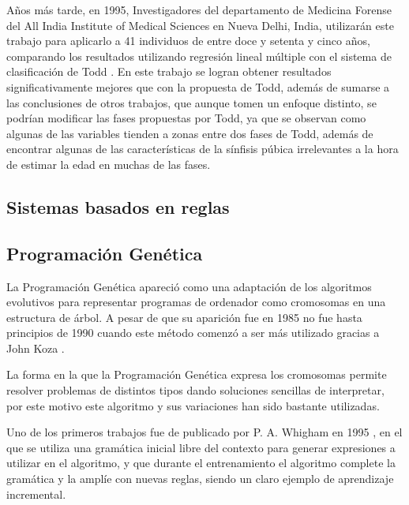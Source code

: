 Años más tarde, en 1995, Investigadores del departamento de Medicina Forense del All India Institute of Medical Sciences en Nueva Delhi, India, utilizarán este trabajo para aplicarlo a 41 individuos de entre doce y setenta y cinco años, comparando los resultados utilizando regresión lineal múltiple con el sistema de clasificación de Todd \cite{estudioComparandoGilbertTodd}. En este trabajo se logran obtener resultados significativamente mejores que con la propuesta de Todd, además de sumarse a las conclusiones de otros trabajos, que aunque tomen un enfoque distinto, se podrían modificar las fases propuestas por Todd, ya que se observan como algunas de las variables tienden a zonas entre dos fases de Todd, además de encontrar algunas de las características de la sínfisis púbica irrelevantes a la hora de estimar la edad en muchas de las fases.



\subsection{Sistemas basados en reglas}


\subsection{Programación Genética}

La Programación Genética apareció como una adaptación de los algoritmos evolutivos para representar programas de ordenador como cromosomas en una estructura de árbol. A pesar de que su aparición fue en 1985 no fue hasta principios de 1990 cuando este método comenzó a ser más utilizado gracias a John Koza \cite{kozaGP}.

La forma en la que la Programación Genética expresa los cromosomas permite resolver problemas de distintos tipos dando soluciones sencillas de interpretar, por este motivo este algoritmo y sus variaciones han sido bastante utilizadas.

Uno de los primeros trabajos fue de publicado por P. A. Whigham en 1995 \cite{PGgramaticas}, en el que se utiliza una gramática inicial libre del contexto para generar expresiones a utilizar en el algoritmo, y que durante el entrenamiento el algoritmo complete la gramática y la amplíe con nuevas reglas, siendo un claro ejemplo de aprendizaje incremental.

